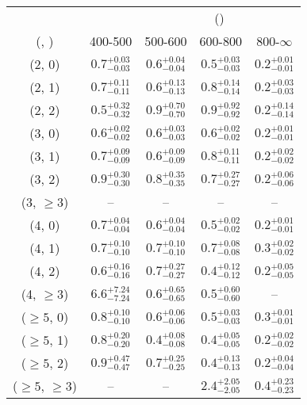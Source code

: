 \begin{table}[h!]
\tiny
\centering
{}
\begin{tabular}
{ccccc}
	\hline\hline
&	& \multicolumn{4}{c}{\scalht (\gev)} \\ 
	 (\njet,  \nb) & 400-500 & 500-600 & 600-800 & 800-$\infty$ \\ [0.8ex] 
\hline
	(2, 0) & $0.7^{+ 0.03 }_{- 0.03 }$ & $0.6^{+ 0.04 }_{- 0.04 }$ & $0.5^{+ 0.03 }_{- 0.03 }$ & $0.2^{+ 0.01 }_{- 0.01 }$ \\[0.5ex] 
	(2, 1) & $0.7^{+ 0.11 }_{- 0.11 }$ & $0.6^{+ 0.13 }_{- 0.13 }$ & $0.8^{+ 0.14 }_{- 0.14 }$ & $0.2^{+ 0.03 }_{- 0.03 }$ \\[0.5ex] 
	(2, 2) & $0.5^{+ 0.32 }_{- 0.32 }$ & $0.9^{+ 0.70 }_{- 0.70 }$ & $0.9^{+ 0.92 }_{- 0.92 }$ & $0.2^{+ 0.14 }_{- 0.14 }$ \\[0.5ex] 
	(3, 0) & $0.6^{+ 0.02 }_{- 0.02 }$ & $0.6^{+ 0.03 }_{- 0.03 }$ & $0.6^{+ 0.02 }_{- 0.02 }$ & $0.2^{+ 0.01 }_{- 0.01 }$ \\[0.5ex] 
	(3, 1) & $0.7^{+ 0.09 }_{- 0.09 }$ & $0.6^{+ 0.09 }_{- 0.09 }$ & $0.8^{+ 0.11 }_{- 0.11 }$ & $0.2^{+ 0.02 }_{- 0.02 }$ \\[0.5ex] 
	(3, 2) & $0.9^{+ 0.30 }_{- 0.30 }$ & $0.8^{+ 0.35 }_{- 0.35 }$ & $0.7^{+ 0.27 }_{- 0.27 }$ & $0.2^{+ 0.06 }_{- 0.06 }$ \\[0.5ex] 
	(3, $\ge3$) & -- & -- & -- & -- \\[0.5ex] 
	(4, 0) & $0.7^{+ 0.04 }_{- 0.04 }$ & $0.6^{+ 0.04 }_{- 0.04 }$ & $0.5^{+ 0.02 }_{- 0.02 }$ & $0.2^{+ 0.01 }_{- 0.01 }$ \\[0.5ex] 
	(4, 1) & $0.7^{+ 0.10 }_{- 0.10 }$ & $0.7^{+ 0.10 }_{- 0.10 }$ & $0.7^{+ 0.08 }_{- 0.08 }$ & $0.3^{+ 0.02 }_{- 0.02 }$ \\[0.5ex] 
	(4, 2) & $0.6^{+ 0.16 }_{- 0.16 }$ & $0.7^{+ 0.27 }_{- 0.27 }$ & $0.4^{+ 0.12 }_{- 0.12 }$ & $0.2^{+ 0.05 }_{- 0.05 }$ \\[0.5ex] 
	(4, $\ge3$) & $6.6^{+ 7.24 }_{- 7.24 }$ & $0.6^{+ 0.65 }_{- 0.65 }$ & $0.5^{+ 0.60 }_{- 0.60 }$ & -- \\[0.5ex] 
	($\ge5$, 0) & $0.8^{+ 0.10 }_{- 0.10 }$ & $0.6^{+ 0.06 }_{- 0.06 }$ & $0.5^{+ 0.03 }_{- 0.03 }$ & $0.3^{+ 0.01 }_{- 0.01 }$ \\[0.5ex] 
	($\ge5$, 1) & $0.8^{+ 0.20 }_{- 0.20 }$ & $0.4^{+ 0.08 }_{- 0.08 }$ & $0.4^{+ 0.05 }_{- 0.05 }$ & $0.2^{+ 0.02 }_{- 0.02 }$ \\[0.5ex] 
	($\ge5$, 2) & $0.9^{+ 0.47 }_{- 0.47 }$ & $0.7^{+ 0.25 }_{- 0.25 }$ & $0.4^{+ 0.13 }_{- 0.13 }$ & $0.2^{+ 0.04 }_{- 0.04 }$ \\[0.5ex] 
	($\ge5$, $\ge3$) & -- & -- & $2.4^{+ 2.05 }_{- 2.05 }$ & $0.4^{+ 0.23 }_{- 0.23 }$ \\[0.5ex] 
	\hline
	\hline
\end{tabular}
\end{table}
